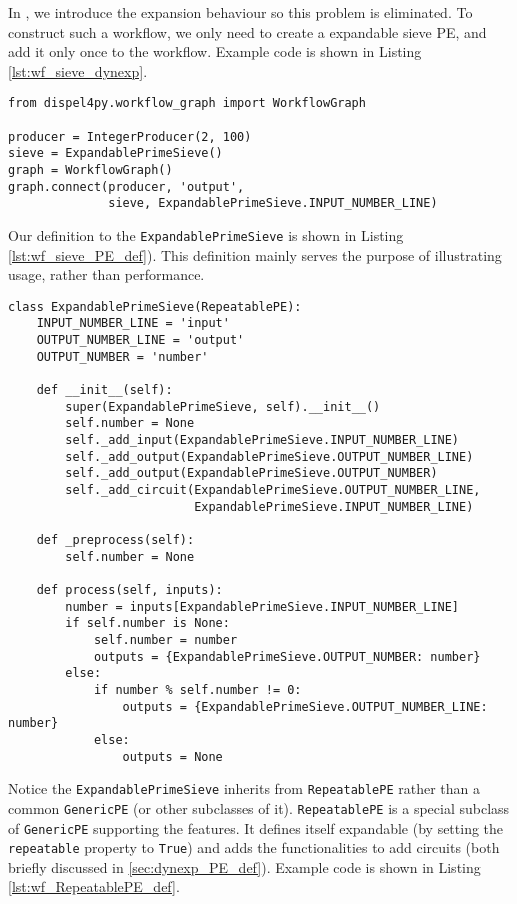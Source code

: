 In \tdynexp, we introduce the expansion behaviour so this problem is eliminated. To construct such a workflow, we only need to create a expandable sieve PE, and add it only once to the workflow. Example code is shown in Listing \ref{lst:wf_sieve_dynexp}.

\begin{lstlisting}[frame=single,caption={Example code of the sieve workflow construction in the new semantics (suppose IntegerProducer and ExpandablePrimeSieve are already defined},captionpos=b,
label={lst:wf_sieve_dynexp}
]
from dispel4py.workflow_graph import WorkflowGraph

producer = IntegerProducer(2, 100)
sieve = ExpandablePrimeSieve()
graph = WorkflowGraph()
graph.connect(producer, 'output',
              sieve, ExpandablePrimeSieve.INPUT_NUMBER_LINE)
\end{lstlisting}

Our definition to the \lstinline|ExpandablePrimeSieve| is shown in Listing \ref{lst:wf_sieve_PE_def}). This definition mainly serves the purpose of illustrating usage, rather than performance.

\begin{lstlisting}[frame=single,caption={Example code of the ExpandablePrimeSieve class},captionpos=b,
label={lst:wf_sieve_PE_def}
]
class ExpandablePrimeSieve(RepeatablePE):
    INPUT_NUMBER_LINE = 'input'
    OUTPUT_NUMBER_LINE = 'output'
    OUTPUT_NUMBER = 'number'

    def __init__(self):
        super(ExpandablePrimeSieve, self).__init__()
        self.number = None
        self._add_input(ExpandablePrimeSieve.INPUT_NUMBER_LINE)
        self._add_output(ExpandablePrimeSieve.OUTPUT_NUMBER_LINE)
        self._add_output(ExpandablePrimeSieve.OUTPUT_NUMBER)
        self._add_circuit(ExpandablePrimeSieve.OUTPUT_NUMBER_LINE,
                          ExpandablePrimeSieve.INPUT_NUMBER_LINE)

    def _preprocess(self):
        self.number = None

    def process(self, inputs):
        number = inputs[ExpandablePrimeSieve.INPUT_NUMBER_LINE]
        if self.number is None:
            self.number = number
            outputs = {ExpandablePrimeSieve.OUTPUT_NUMBER: number}
        else:
            if number % self.number != 0:
                outputs = {ExpandablePrimeSieve.OUTPUT_NUMBER_LINE: number}
            else:
                outputs = None
\end{lstlisting}

Notice the \lstinline|ExpandablePrimeSieve| inherits from \lstinline|RepeatablePE| rather than a common \lstinline|GenericPE| (or other subclasses of it). \lstinline|RepeatablePE| is a special subclass of \lstinline|GenericPE| supporting the \tdynexp features. It defines itself expandable (by setting the \lstinline|repeatable| property to \lstinline|True|) and adds the functionalities to add circuits (both briefly discussed in \ref{sec:dynexp_PE_def}). Example code is shown in Listing \ref{lst:wf_RepeatablePE_def}.

